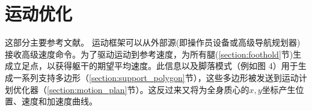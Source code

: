


\chapter{运动优化}

这部分主要参考文献\cite[p3-6]{Bellicoso_Jenelten_Fankhauser_Gehring_Hwangbo_Hutter_2017}。
运动框架可以从外部源(即操作员设备或高级导航规划器)接收高级速度命令。为了驱动运动到参考速度，为所有腿(\ref{section:foothold}节)生成立足点，以获得躯干的期望平均速度。此信息以及脚落模式（例如图 4）用于生成一系列支持多边形（\ref{section:support_polygon}节），这些多边形被发送到运动计划优化器（\ref{section:motion_plan}节）。这反过来又将为全身质心的$x,y$坐标产生位置、速度和加速度曲线。

